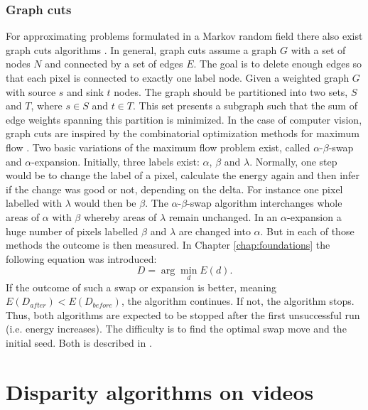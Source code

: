 \subsubsection{Graph cuts}

For approximating problems formulated in a Markov random field there also exist graph cuts algorithms \citep{boykov2001fast, cyganek2011introduction}.
In general, graph cuts assume a graph $G$ with a set of nodes $N$ and connected by a set of edges $E$.
The goal is to delete enough edges so that each pixel is connected to exactly one label node.
Given a weighted graph $G$ with source $s$ and sink $t$ nodes.
The graph should be partitioned into two sets, $S$ and $T$, where $s \in S$ and $t \in T$.
This set presents a subgraph such that the sum of edge weights spanning this partition is minimized.
\newline\newline\noindent In the case of computer vision, graph cuts are inspired by the combinatorial optimization methods for maximum flow \citep{cyganek2011introduction, cormen2009introduction}.
Two basic variations of the maximum flow problem exist, called $\alpha$-$\beta$-swap and $\alpha$-expansion.
Initially, three labels exist: $\alpha$, $\beta$ and $\lambda$. 
Normally, one step would be to change the label of a pixel, calculate the energy again and then infer if the change was good or not, depending on the delta.
For instance one pixel labelled with $\lambda$ would then be $\beta$.
The $\alpha$-$\beta$-swap algorithm interchanges whole areas of $\alpha$ with $\beta$ whereby areas of $\lambda$ remain unchanged.
In an $\alpha$-expansion a huge number of pixels labelled $\beta$ and $\lambda$ are changed into $\alpha$.
But in each of those methods the outcome is then measured.
In Chapter \ref{chap:foundations} the following equation was introduced:
\begin{equation}
  D = \arg\min_{d} E(d).
\end{equation}
\noindent If the outcome of such a swap or expansion is better, meaning $E(D_{after}) < E(D_{before})$, the algorithm continues.
If not, the algorithm stops.
Thus, both algorithms are expected to be stopped after the first unsuccessful run (i.e. energy increases).
The difficulty is to find the optimal swap move and the initial seed.
Both is described in \citep{boykov2001fast, sinha2004graph, tappen2003comparison, ramin2004energy}.

\section{Disparity algorithms on videos}

